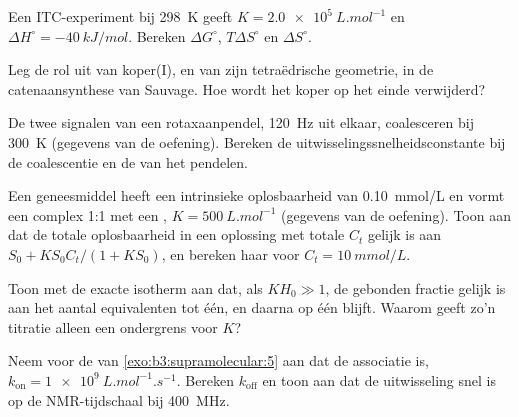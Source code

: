 \begin{exercise}[$\star\star$]\label{exo:b3:supramolecular:7}
Een ITC-experiment bij \qty{298}{K} geeft $K = \qty{2.0e5}{L.mol^{-1}}$ en $\Delta H^\circ = \qty{-40}{kJ/mol}$. Bereken $\Delta G^\circ$, $T\Delta S^\circ$ en
$\Delta S^\circ$.
\end{exercise}

\begin{exercise}[$\star\star$]\label{exo:b3:supramolecular:8}
Leg de rol uit van koper(I), en van zijn tetraëdrische geometrie, in de
catenaansynthese van Sauvage. Hoe wordt het koper op het einde
verwijderd?
\end{exercise}

\begin{exercise}[$\star\star$]\label{exo:b3:supramolecular:9}
De twee signalen van een rotaxaanpendel, \qty{120}{Hz} uit elkaar, coalesceren bij \qty{300}{K} (gegevens van de
oefening). Bereken de uitwisselingssnelheidsconstante bij de coalescentie
en de  van het pendelen.
\end{exercise}

\begin{exercise}[$\star\star\star$]\label{exo:b3:supramolecular:10}
Een geneesmiddel heeft een intrinsieke oplosbaarheid van \qty{0.10}{mmol/L} en vormt een complex 1:1 met een
, $K = \qty{500}{L.mol^{-1}}$ (gegevens van de oefening). Toon aan dat de totale oplosbaarheid in een
oplossing met totale  $C_t$ gelijk is aan $S_0 + KS_0C_t/(1 + KS_0)$, en bereken haar voor $C_t = \qty{10}{mmol/L}$.
\end{exercise}

\begin{exercise}[$\star\star\star$]\label{exo:b3:supramolecular:11}
Toon met de exacte isotherm aan dat, als $KH_0 \gg 1$, de gebonden fractie gelijk is aan het
aantal equivalenten tot één, en daarna op één blijft. Waarom geeft zo'n
titratie alleen een ondergrens voor $K$?
\end{exercise}

\begin{exercise}[$\star\star\star$]\label{exo:b3:supramolecular:12}
Neem voor de  van \cref{exo:b3:supramolecular:5} aan dat de
associatie  is, $k_{\mathrm{on}} = \qty{1e9}{L.mol^{-1}.s^{-1}}$. Bereken $k_{\mathrm{off}}$ en toon aan dat de uitwisseling snel is op
de NMR-tijdschaal bij \qty{400}{MHz}.
\end{exercise}

